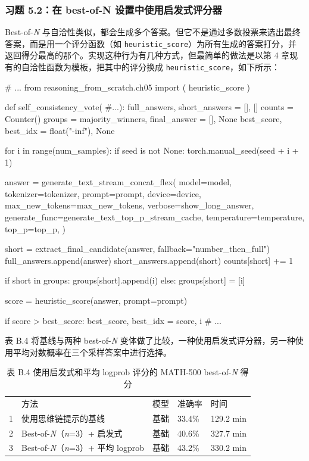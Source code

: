 \subsubsection*{习题 5.2：在 best-of-N 设置中使用启发式评分器}

Best-of-\emph{N} 与自洽性类似，都会生成多个答案。但它不是通过多数投票来选出最终答案，而是用一个评分函数（如 \texttt{heuristic\_score}）为所有生成的答案打分，并返回得分最高的那个。实现这种行为有几种方式，但最简单的做法是以第 4 章现有的自洽性函数为模板，把其中的评分换成 \texttt{heuristic\_score}，如下所示：

\begin{codebox}
# ...
from reasoning_from_scratch.ch05 import (
    heuristic_score
)

def self_consistency_vote( #...):
    full_answers, short_answers = [], []
    counts = Counter()
    groups = {}
    majority_winners, final_answer = [], None
    best_score, best_idx = float("-inf"), None

    for i in range(num_samples):
        if seed is not None:
            torch.manual_seed(seed + i + 1)

        answer = generate_text_stream_concat_flex(
            model=model,
            tokenizer=tokenizer,
            prompt=prompt,
            device=device,
            max_new_tokens=max_new_tokens,
            verbose=show_long_answer,
            generate_func=generate_text_top_p_stream_cache,
            temperature=temperature,
            top_p=top_p,
        )

        short = extract_final_candidate(answer, fallback="number_then_full")
        full_answers.append(answer)
        short_answers.append(short)
        counts[short] += 1

        if short in groups:
            groups[short].append(i)
        else:
            groups[short] = [i]

        score = heuristic_score(answer, prompt=prompt)

        if score > best_score:
            best_score, best_idx = score, i
        # ...
\end{codebox}

表 B.4 将基线与两种 best-of-\emph{N} 变体做了比较，一种使用启发式评分器，另一种使用平均对数概率在三个采样答案中进行选择。

\begin{table}[htbp]
\centering\small
\centering
\caption{表 B.4 使用启发式和平均 logprob 评分的 MATH-500 best-of-\emph{N} 得分}
\begin{tabularx}{\linewidth}{@{}c@{}XXXX}
\toprule
 & 方法 & 模型 & 准确率 & 时间 \\
1 & 使用思维链提示的基线 & 基础 & 33.4\% & 129.2 min \\
2 & Best-of-\emph{N}（\emph{n}=3）+ 启发式 & 基础 & 40.6\% & 327.7 min \\
3 & Best-of-\emph{N}（\emph{n}=3）+ 平均 logprob & 基础 & 43.2\% & 330.2 min \\ \bottomrule
\end{tabularx}
\end{table}

